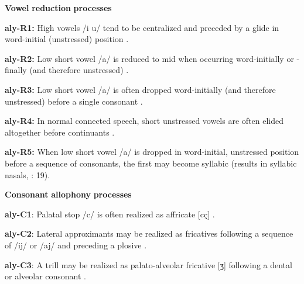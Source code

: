 \documentclass[output=paper]{langsci/langscibook}
\begin{document}
\begin{styleBody}
\textbf{Vowel} \textbf{reduction} \textbf{processes}
\end{styleBody}

\begin{styleBody}
\textbf{aly-R1:} High vowels /i u/ tend to be centralized and preceded by a glide in word-initial (unstressed) position \citep[25]{Yallop1977}.
\end{styleBody}

\begin{styleBody}
\textbf{aly-R2:} Low short vowel /a/ is reduced to mid when occurring word-initially or -finally (and therefore unstressed) \citep[25]{Yallop1977}.
\end{styleBody}

\begin{styleBody}
\textbf{aly-R3:} Low short vowel /a/ is often dropped word-initially (and therefore unstressed) before a single consonant \citep[28]{Yallop1977}.
\end{styleBody}

\begin{styleBody}
\textbf{aly-R4:} In normal connected speech, short unstressed vowels are often elided altogether before continuants \citep[27]{Yallop1977}.
\end{styleBody}

\begin{styleBody}
\textbf{aly-R5:} When low short vowel /a/ is dropped in word-initial, unstressed position before a sequence of consonants, the first may become syllabic (results in syllabic nasals, \citealt{Yallop1977}: 19).
\end{styleBody}

\begin{styleBody}
\textbf{Consonant} \textbf{allophony} \textbf{processes}
\end{styleBody}

\begin{styleBody}
\textbf{aly-C1}: Palatal stop /c/ is often realized as affricate [cç] \citep[21]{Yallop1977}.
\end{styleBody}

\begin{styleBody}
\textbf{aly-C2}: Lateral approximants may be realized as fricatives following a sequence of /ij/ or /aj/ and preceding a plosive \citep[19]{Yallop1977}.
\end{styleBody}

\begin{styleBody}
\textbf{aly-C3}: A trill may be realized as palato-alveolar fricative [ʒ] following a dental or alveolar consonant \citep[19]{Yallop1977}.
\end{styleBody}
\end{document}

